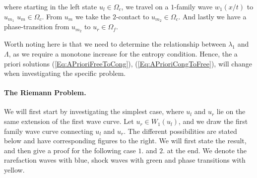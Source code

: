 \documentclass[10pt]{article}
\numberwithin{equation}{section}
\begin{document}
where starting in the left state $u_l \in \Omega_c$, we travel on a $1$-family wave $w_1(x/t)$ to $u_{m_1}$ $u_m \in \Omega_c$. From $u_m$ we take the $2$-contact to $u_{m_2} \in \Omega_c$. And lastly we have a phase-transition from $u_{m_2}$ to $u_r \in \Omega_f$. 

Worth noting here is that we need to determine the relationship between $\lambda_1$ and $\Lambda$, as we require a monotone increase for the entropy condition. Hence, the a priori solutions (\ref{Eq:APrioriFreeToCong}), (\ref{Eq:APrioriCongToFree}), will change when investigating the specific problem. 



\paragraph{The Riemann Problem.}
We will first start by investigating the simplest case, where $u_l$ and $u_r$ lie on the same extension of the first wave curve. Let $ u_r \in W_1(u_l)$, and we draw the first family wave curve connecting $u_l$ and $u_r$. The different possibilities are stated below and have corresponding figures to the right. We will first state the result, and then give a proof for the following case $1.$ and $2.$ at the end. We denote the rarefaction waves with blue, shock waves with green and phase transitions with yellow.  
\end{document}
